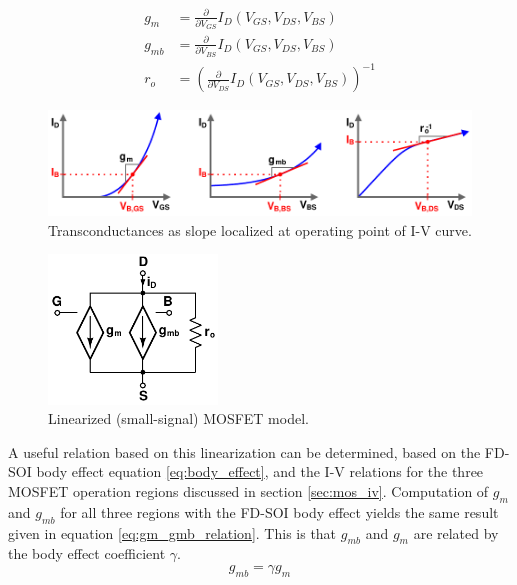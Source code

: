 	\begin{align}
		g_m & = \frac{\partial }{\partial V_{GS}}I_D(V_{GS}, V_{DS}, V_{BS}) \label{eq:gm}\\
		g_{mb} & = \frac{\partial }{\partial V_{BS}}I_D(V_{GS}, V_{DS}, V_{BS})\\
		r_o &= \left(\frac{\partial }{\partial V_{DS}}I_D(V_{GS}, V_{DS}, V_{BS})\right)^{-1}\label{eq:fet_out_r}
	\end{align}
		\begin{figure}[htb!]
		        \centering
		        \includegraphics[width=1\textwidth, angle=0]{./figs/theory/lin_oppoint}
		    \caption{Transconductances as slope localized at operating point of I-V curve.}
		    \label{fig:lin_oppoint}
		\end{figure}

		\begin{figure}[htb!]
		        \centering
		        \includegraphics[width=0.4\textwidth, angle=0]{./figs/theory/ss_model}
		    \caption{Linearized (small-signal) MOSFET model.}
		    \label{fig:ss_model}
		\end{figure}
		\FloatBarrier
	A useful relation based on this linearization can be determined, based on the FD-SOI body effect equation \ref{eq:body_effect}, and the I-V relations for the three MOSFET operation regions discussed in section \ref{sec:mos_iv}. Computation of $g_{m}$ and $g_{mb}$ for all three regions with the FD-SOI body effect yields the same result given in equation \ref{eq:gm_gmb_relation}. This is that $g_{mb}$ and $g_{m}$ are related by the body effect coefficient $\gamma$.
	\begin{equation}\label{eq:gm_gmb_relation}
	g_{mb} = \gamma g_{m}
	\end{equation}

